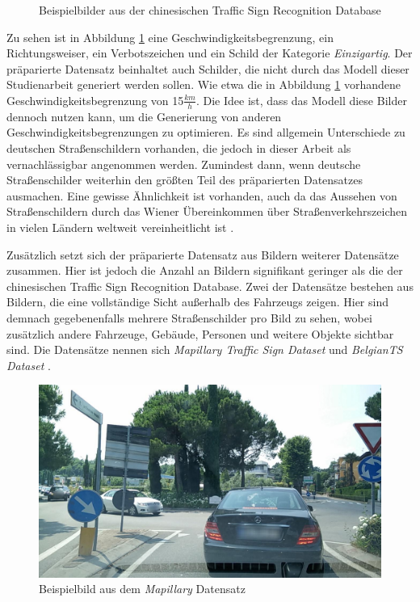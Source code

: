 \begin{figure}[H]
\begin{subfigure}[b]{0.125\textwidth}
     \caption{}
 \end{subfigure}
       \caption{Beispielbilder aus der chinesischen Traffic Sign Recognition Database \cite{chinese-dataset}}
       \label{fig:chinese-dataset-bsp-images}
 \end{figure}

Zu sehen ist in Abbildung \ref{fig:chinese-dataset-bsp-images} eine Geschwindigkeitsbegrenzung, ein Richtungsweiser, ein Verbotszeichen und ein Schild der Kategorie \emph{Einzigartig}. Der präparierte Datensatz beinhaltet auch Schilder, die nicht durch das Modell dieser Studienarbeit generiert werden sollen. Wie etwa die in Abbildung \ref{fig:chinese-dataset-bsp-images} vorhandene Geschwindigkeitsbegrenzung von 15$\frac{km}{h}$. Die Idee ist, dass das Modell diese Bilder dennoch nutzen kann, um die Generierung von anderen Geschwindigkeitsbegrenzungen zu optimieren. Es sind allgemein Unterschiede zu deutschen Straßenschildern vorhanden, die jedoch in dieser Arbeit als vernachlässigbar angenommen werden. Zumindest dann, wenn deutsche Straßenschilder weiterhin den größten Teil des präparierten Datensatzes ausmachen. Eine gewisse Ähnlichkeit ist vorhanden, auch da das Aussehen von Straßenschildern durch das Wiener Übereinkommen über Straßenverkehrszeichen in vielen Ländern weltweit vereinheitlicht ist \cite{vienna-convention}. \cite{chinese-dataset}

Zusätzlich setzt sich der präparierte Datensatz aus Bildern weiterer Datensätze zusammen. Hier ist jedoch die Anzahl an Bildern signifikant geringer als die der chinesischen Traffic Sign Recognition Database. Zwei der Datensätze bestehen aus Bildern, die eine vollständige Sicht außerhalb des Fahrzeugs zeigen. Hier sind demnach gegebenenfalls mehrere Straßenschilder pro Bild zu sehen, wobei zusätzlich andere Fahrzeuge, Gebäude, Personen und weitere Objekte sichtbar sind. Die Datensätze nennen sich \emph{Mapillary Traffic Sign Dataset} und \emph{BelgianTS Dataset} \cite{dataset-mapillary} \cite{dataset-belgiants}.
\begin{figure}[h]
    \centering
    \includegraphics[height=0.3\textwidth]{../images/3 Konzeption des Generative Adversarial Networks/mapillary.jpg}
    \caption{Beispielbild aus dem \emph{Mapillary} Datensatz \cite{dataset-mapillary}}
    \label{fig:full-mapillary-image}
\end{figure}

